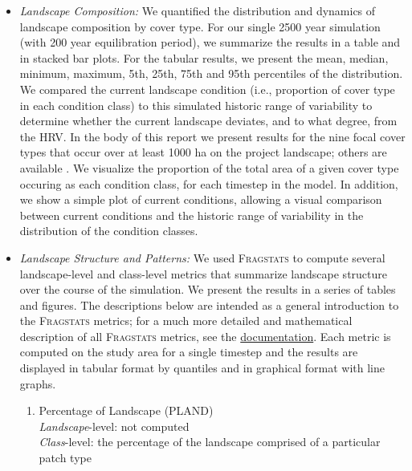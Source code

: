 \begin{itemize}
\item \emph{Landscape Composition:} We quantified the distribution and dynamics of landscape composition by cover type. For our single 2500 year simulation (with 200 year equilibration period), we summarize the results in a table and in stacked bar plots. For the tabular results, we present the mean, median, minimum, maximum, 5th, 25th, 75th and 95th percentiles of the distribution. We compared the current landscape condition (i.e., proportion of cover type in each condition class) to this simulated historic range of variability to determine whether the current landscape deviates, and to what degree, from the HRV. In the body of this report we present results for the nine focal cover types that occur over at least 1000 ha on the project landscape; others are available . We visualize the proportion of the total area of a given cover type occuring as each condition class, for each timestep in the model. In addition, we show a simple plot of current conditions, allowing a visual comparison between current conditions and the historic range of variability in the distribution of the condition classes.

\item \emph{Landscape Structure and Patterns:} We used \textsc{Fragstats}  to compute several landscape-level and class-level metrics that summarize landscape structure over the course of the simulation. We present the results in a series of tables and figures. The descriptions below are intended as a general introduction to the \textsc{Fragstats} metrics; for a much more detailed and mathematical description of all \textsc{Fragstats} metrics, see the \href{http://www.umass.edu/landeco/research/fragstats/documents/fragstats.help.4.2.pdf}{documentation}. Each metric is computed on the study area for a single timestep and the results are displayed in tabular format by quantiles and in graphical format with line graphs.

	\begin{enumerate}
		\item Percentage of Landscape (PLAND)\\
		\emph{Landscape}-level: not computed\\
		\emph{Class}-level: the percentage of the landscape comprised of a particular patch type\\
		


\end{enumerate}
\end{itemize}
